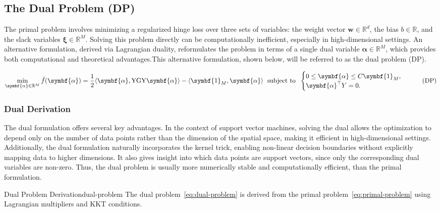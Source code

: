 \subsection{The Dual Problem (DP)}
The primal problem involves minimizing a regularized hinge loss over three sets of variables: 
the weight vector $\symbf{w} \in \mathbb{R}^d$, the bias $b \in \mathbb{R}$, and the slack variables 
$\symbf{\xi} \in \mathbb{R}^M$. Solving this problem directly can be computationally inefficient, 
especially in high-dimensional settings. An alternative formulation, derived via Lagrangian duality, 
reformulates the problem in terms of a single dual variable $\symbf{\alpha} \in \mathbb{R}^M$, 
which provides both computational and theoretical advantages.This alternative 
formulation, shown below, will be referred to as the dual problem (DP).

\begin{equation}\label{eq:dual-problem}
	\min_{\symbf{\alpha} \in \R^M} \tilde{f}(\symbf{\alpha}) = \frac12 \inner*{\symbf{\alpha}, \mathrm{Y} \mathrm{G} \mathrm{Y} \symbf{\alpha}} -  \inner*{\symbf{1}_M, \symbf{\alpha}}
	\;
	\text{ subject to }
	\;
	\begin{cases}
		0 \leq \symbf{\alpha} \leq C\symbf{1}_M,\\
		\symbf{\alpha}^\top Y = 0.
	\end{cases}
	\tag{DP}
\end{equation}


\subsubsection{Dual Derivation}
The dual formulation offers several key advantages. In the context of support vector machines,
solving the dual allows the optimization to depend only on the number of data points rather than
the dimension of the spatial space, making it efficient in high-dimensional settings.
Additionally, the dual formulation naturally incorporates the kernel trick, enabling non-linear
decision boundaries without explicitly mapping data to higher dimensions. It also gives insight
into which data points are support vectors, since only the corresponding dual variables are non-zero.
Thus, the dual problem is usually more numerically stable and computationally efficient, than the
primal formulation.

\begin{theorem}{Dual Problem Derivation}{dual-problem}
	The dual problem~\eqref{eq:dual-problem} is derived from the primal 
	problem~\eqref{eq:primal-problem} using Lagrangian multipliers and KKT conditions.
\end{theorem}

